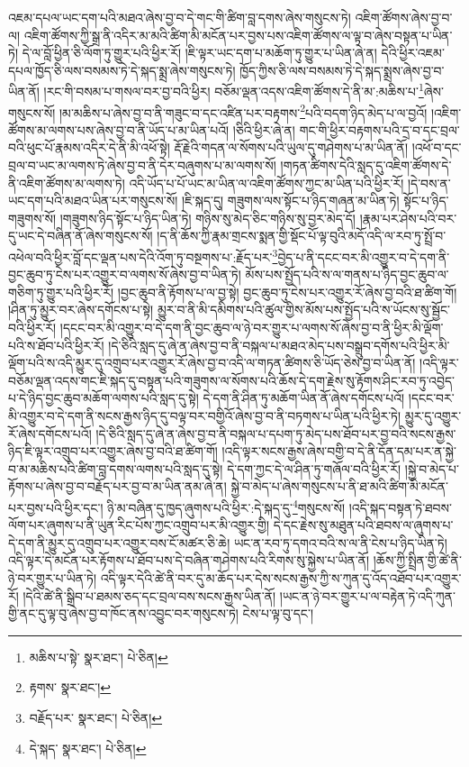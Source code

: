 འཇམ་དཔལ་ཡང་དག་པའི་མཐའ་ཞེས་བྱ་བ་དེ་གང་གི་ཚིག་བླ་དགས་ཞེས་གསུངས་ཏེ། འཇིག་ཚོགས་ཞེས་བྱ་བ་ལ། འཇིག་ཚོགས་ཀྱི་སྒྲ་ནི་འདིར་མ་མའི་ཚིག་མི་མངོན་པར་བྱས་པས་འཇིག་ཚོགས་ལ་ལྟ་བ་ཞེས་བསྟན་པ་ཡིན་ཏེ། དེ་ལ་བློ་ཕྱིན་ཅི་ལོག་ཏུ་གྱུར་པའི་ཕྱིར་རོ། །ཇི་ལྟར་ཡང་དག་པ་མཆོག་ཏུ་གྱུར་པ་ཡིན་ཞེ་ན། དེའི་ཕྱིར་འཇམ་དཔལ་ཁྱོད་ཅི་ལས་བསམས་ཏེ་དེ་སྐད་སྨྲ་ཞེས་གསུངས་ཏེ། ཁྱོད་ཀྱིས་ཅི་ལས་བསམས་ཏེ་དེ་སྐད་སྨྲས་ཞེས་བྱ་བ་ཡིན་ནོ། །རང་གི་བསམ་པ་གསལ་བར་བྱ་བའི་ཕྱིར། བཅོམ་ལྡན་འདས་འཇིག་ཚོགས་དེ་ནི་མ་:མཆིས་པ་\footnote{མཆིས་པ་སྟེ་  སྣར་ཐང་།  པེ་ཅིན། }ཞེས་གསུངས་སོ། །མ་མཆིས་པ་ཞེས་བྱ་བ་ནི་གཟུང་བ་དང་འཛིན་པར་བརྟགས་\footnote{རྟགས་  སྣར་ཐང་། }པའི་བདག་ཉིད་མེད་པ་ལ་བྱའོ། །འཇིག་ཚོགས་མ་ལགས་པས་ཞེས་བྱ་བ་ནི་ཡོད་པ་མ་ཡིན་པའོ། །ཅིའི་ཕྱིར་ཞེ་ན། གང་གི་ཕྱིར་བརྟགས་པའི་དྲ་བ་དང་བྲལ་བའི་ཕུང་པོ་རྣམས་འདིར་དེ་ནི་མི་འཕོ་སྟེ། རྡོ་རྗེའི་གདན་ལ་སོགས་པའི་ཡུལ་དུ་གཤེགས་པ་མ་ཡིན་ནོ། །འཕོ་བ་དང་བྲལ་བ་ཡང་མ་ལགས་ཏེ་ཞེས་བྱ་བ་ནི་དེར་བཞུགས་པ་མ་ལགས་སོ། །གཏན་ཚིགས་དེའི་སླད་དུ་འཇིག་ཚོགས་དེ་ནི་འཇིག་ཚོགས་མ་ལགས་ཏེ། འདི་ཡོད་པ་པོ་ཡང་མ་ཡིན་ལ་འཇིག་ཚོགས་ཀྱང་མ་ཡིན་པའི་ཕྱིར་རོ། །དེ་བས་ན་ཡང་དག་པའི་མཐའ་ཡིན་པར་གསུངས་སོ། །ཇི་སྐད་དུ། གཟུགས་ལས་སྟོང་པ་ཉིད་གཞན་མ་ཡིན་ཏེ། སྟོང་པ་ཉིད་གཟུགས་སོ། །གཟུགས་ཉིད་སྟོང་པ་ཉིད་ཡིན་ཏེ། གཉིས་སུ་མེད་ཅིང་གཉིས་སུ་བྱར་མེད་དོ། །རྣམ་པར་ཤེས་པའི་བར་དུ་ཡང་དེ་བཞིན་ནོ་ཞེས་གསུངས་སོ། །ད་ནི་ཆོས་ཀྱི་རྣམ་གྲངས་སྨན་གྱི་སྡོང་པོ་ལྟ་བུའི་མདོ་འདི་ལ་རབ་ཏུ་སྤྲོ་བ་འཕེལ་བའི་ཕྱིར་བློ་དང་ལྡན་པས་དེའི་འོག་ཏུ་བསྔགས་པ་:རྗོད་པར་\footnote{བརྗོད་པར་  སྣར་ཐང་།  པེ་ཅིན། }བྱེད་པ་ནི་དངང་བར་མི་འགྱུར་བ་དེ་དག་ནི་བྱང་ཆུབ་ཏུ་ངེས་པར་འགྱུར་བ་ལགས་སོ་ཞེས་བྱ་བ་ཡིན་ཏེ། མོས་པས་སྤྱོད་པའི་ས་ལ་གནས་པ་ཉིད་བྱང་ཆུབ་ལ་གཅིག་ཏུ་གྱུར་པའི་ཕྱིར་རོ། །བྱང་ཆུབ་ནི་རྟོགས་པ་ལ་བྱ་སྟེ། བྱང་ཆུབ་ཏུ་ངེས་པར་འགྱུར་རོ་ཞེས་བྱ་བའི་ཐ་ཚིག་གོ། །ཤིན་ཏུ་མྱུར་བར་ཞེས་དགོངས་པ་སྟེ། མྱུར་བ་ནི་མི་དམིགས་པའི་ཚུལ་གྱིས་མོས་པས་སྤྱོད་པའི་ས་ཡོངས་སུ་སྦྱོང་བའི་ཕྱིར་རོ། །དངང་བར་མི་འགྱུར་བ་དེ་དག་ནི་བྱང་ཆུབ་ལ་ཉེ་བར་གྱུར་པ་ལགས་སོ་ཞེས་བྱ་བ་ནི་ཕྱིར་མི་ལྡོག་པའི་ས་ཐོབ་པའི་ཕྱིར་རོ། །དེ་ཅིའི་སླད་དུ་ཞེ་ན་ཞེས་བྱ་བ་ནི་བསྐལ་པ་མཐའ་མེད་པས་བསྒྲུབ་དགོས་པའི་ཕྱིར་མི་ལྡོག་པའི་ས་འདི་མྱུར་དུ་འགྲུབ་པར་འགྱུར་རོ་ཞེས་བྱ་བ་འདི་ལ་གཏན་ཚིགས་ཅི་ཡོད་ཅེས་བྱ་བ་ཡིན་ནོ། །འདི་ལྟར་བཅོམ་ལྡན་འདས་གང་ཇི་སྐད་དུ་བསྟན་པའི་གཟུགས་ལ་སོགས་པའི་ཆོས་དེ་དག་རྗེས་སུ་རྟོགས་ཤིང་རབ་ཏུ་འབྱེད་པ་དེ་ཉིད་བྱང་ཆུབ་མཆོག་ལགས་པའི་སླད་དུ་སྟེ། དེ་དག་ནི་ཤིན་ཏུ་མཆོག་ཡིན་ནོ་ཞེས་དགོངས་པའོ། །དངང་བར་མི་འགྱུར་བ་དེ་དག་ནི་སངས་རྒྱས་ཉིད་དུ་བལྟ་བར་བགྱིའོ་ཞེས་བྱ་བ་ནི་བཏགས་པ་ཡིན་པའི་ཕྱིར་ཏེ། མྱུར་དུ་འགྱུར་རོ་ཞེས་དགོངས་པའོ། །དེ་ཅིའི་སླད་དུ་ཞེ་ན་ཞེས་བྱ་བ་ནི་བསྐལ་པ་དཔག་ཏུ་མེད་པས་ཐོབ་པར་བྱ་བའི་སངས་རྒྱས་ཉིད་ཇི་ལྟར་འགྲུབ་པར་འགྱུར་ཞེས་བྱ་བའི་ཐ་ཚིག་གོ། །འདི་ལྟར་སངས་རྒྱས་ཞེས་བགྱི་བ་དེ་ནི་དོན་དམ་པར་ན་སྐྱེ་བ་མ་མཆིས་པའི་ཚིག་བླ་དགས་ལགས་པའི་སླད་དུ་སྟེ། དེ་དག་ཀྱང་དེ་ལ་ཤིན་ཏུ་གཞོལ་བའི་ཕྱིར་རོ། །སྐྱེ་བ་མེད་པ་རྟོགས་པ་ཞེས་བྱ་བ་བརྗོད་པར་བྱ་བ་མ་ཡིན་ནམ་ཞེ་ན། སྐྱེ་བ་མེད་པ་ཞེས་གསུངས་པ་ནི་ཐ་མའི་ཚིག་མི་མངོན་པར་བྱས་པའི་ཕྱིར་དང་། ཉི་མ་བཞིན་དུ་ཁྱད་ཞུགས་པའི་ཕྱིར་:དེ་སྐད་དུ་\footnote{དེ་སྐད་  སྣར་ཐང་།  པེ་ཅིན། }གསུངས་སོ། །འདི་སྐད་བསྟན་ཏེ་ཐབས་ལོག་པར་ཞུགས་པ་ནི་ཡུན་རིང་པོས་ཀྱང་འགྲུབ་པར་མི་འགྱུར་གྱི། དེ་དང་རྗེས་སུ་མཐུན་པའི་ཐབས་ལ་ཞུགས་པ་དེ་དག་ནི་མྱུར་དུ་འགྲུབ་པར་འགྱུར་བས་ངོ་མཚར་ཅི་ཆེ། ཡང་ན་རབ་ཏུ་དགའ་བའི་ས་ལ་ནི་ངེས་པ་ཉིད་ཡིན་ཏེ། འདི་ལྟར་དེ་མངོན་པར་རྟོགས་པ་ཐོབ་པས་དེ་བཞིན་གཤེགས་པའི་རིགས་སུ་སྐྱེས་པ་ཡིན་ནོ། །ཆོས་ཀྱི་སྤྲིན་གྱི་ཚེ་ནི་ཉེ་བར་གྱུར་པ་ཡིན་ཏེ། འདི་ལྟར་དེའི་ཚེ་ནི་བར་དུ་མ་ཆོད་པར་དེས་སངས་རྒྱས་ཀྱི་ས་ཀུན་དུ་འོད་འཐོབ་པར་འགྱུར་རོ། །དེའི་ཚེ་ནི་སྒྲིབ་པ་ཐམས་ཅད་དང་བྲལ་བས་སངས་རྒྱས་ཡིན་ནོ། །ཡང་ན་ཉེ་བར་གྱུར་པ་ལ་བརྟེན་ཏེ་འདི་ཀུན་གྱི་ནང་དུ་ལྟ་བུ་ཞེས་བྱ་བ་ཁོང་ནས་འབྱུང་བར་གསུངས་ཏེ། ངེས་པ་ལྟ་བུ་དང་། 